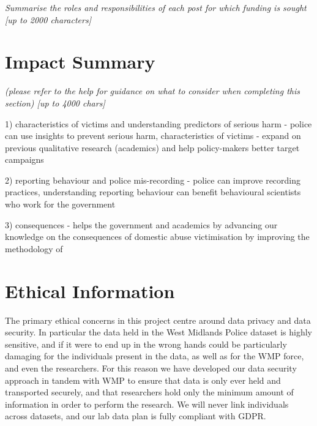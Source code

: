 \documentclass[11pt, a4paper]{article}
\begin{document}
\textit{Summarise the roles and responsibilities of each post for which funding is sought [up to 2000 characters]}

\section{Impact Summary }

%
%
%
%
%
%
%
%



\textit{(please refer to the help for guidance on what to consider when completing this section) [up to 4000 chars]}

1) characteristics of victims and understanding predictors of serious harm - police can use insights to prevent serious harm, characteristics of victims - expand on previous qualitative research (academics) and help policy-makers better target campaigns

2) reporting behaviour and police mis-recording - police can improve recording practices, understanding reporting behaviour can benefit behavioural scientists who work for the government

3) consequences - helps the government and academics by advancing our knowledge on the consequences of domestic abuse victimisation by improving the methodology of
  
  
  

\section{Ethical Information}

The primary ethical concerns in this project centre around data privacy and data security. In particular the data held in the West Midlands Police dataset is highly sensitive, and if it were to end up in the wrong hands could be particularly damaging for the individuals present in the data, as well as for the WMP force, and even the researchers. For this reason we have developed our data security approach in tandem with WMP to ensure that data is only ever held and transported securely, and that researchers hold only the minimum amount of information in order to perform the research. We will never link individuals across datasets, and our lab data plan is fully compliant with GDPR.
\end{document}
